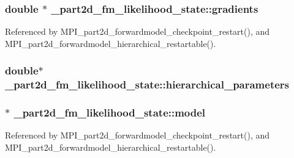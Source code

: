 \subsubsection[{\texorpdfstring{gradients}{gradients}}]{\setlength{\rightskip}{0pt plus 5cm}double $\ast$ \+\_\+part2d\+\_\+fm\+\_\+likelihood\+\_\+state\+::gradients}\hypertarget{struct__part2d__fm__likelihood__state_adaee9d34479641bd0dfeacaa06512978}{}\label{struct__part2d__fm__likelihood__state_adaee9d34479641bd0dfeacaa06512978}


Referenced by M\+P\+I\+\_\+part2d\+\_\+forwardmodel\+\_\+checkpoint\+\_\+restart(), and M\+P\+I\+\_\+part2d\+\_\+forwardmodel\+\_\+hierarchical\+\_\+restartable().

\subsubsection[{\texorpdfstring{hierarchical\+\_\+parameters}{hierarchical_parameters}}]{\setlength{\rightskip}{0pt plus 5cm}double$\ast$ \+\_\+part2d\+\_\+fm\+\_\+likelihood\+\_\+state\+::hierarchical\+\_\+parameters}\hypertarget{struct__part2d__fm__likelihood__state_a074fb00b92c2dc794a63cd5d1882cf79}{}\label{struct__part2d__fm__likelihood__state_a074fb00b92c2dc794a63cd5d1882cf79}
\subsubsection[{\texorpdfstring{model}{model}}]{ $\ast$ \+\_\+part2d\+\_\+fm\+\_\+likelihood\+\_\+state\+::model}\hypertarget{struct__part2d__fm__likelihood__state_ac9e0cd9ecd351409ce9a0dbff9e2cd78}{}\label{struct__part2d__fm__likelihood__state_ac9e0cd9ecd351409ce9a0dbff9e2cd78}


Referenced by M\+P\+I\+\_\+part2d\+\_\+forwardmodel\+\_\+checkpoint\+\_\+restart(), and M\+P\+I\+\_\+part2d\+\_\+forwardmodel\+\_\+hierarchical\+\_\+restartable().

